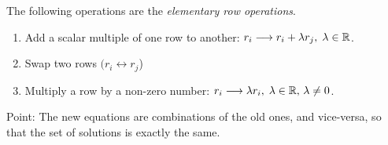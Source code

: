 \documentclass[10pt]{scrartcl}
\begin{document}
\begin{definition}
The following operations are the \emph{elementary row operations}. 
\begin{enumerate}
\item Add a scalar multiple of one row to another: $r_i \longrightarrow r_i + \lambda r_j,\; \lambda\in\mathbb{R}$. 
\item Swap two rows $(r_i \leftrightarrow r_j$)
\item Multiply a row by a non-zero number: $r_i \longrightarrow \lambda r_i,\; \lambda\in\mathbb{R},\,\lambda\neq 0$. 	
\end{enumerate}	
\end{definition}

Point: The new equations are combinations of the old ones, and vice-versa, so that the set of solutions is exactly the same.\\
\end{document}
